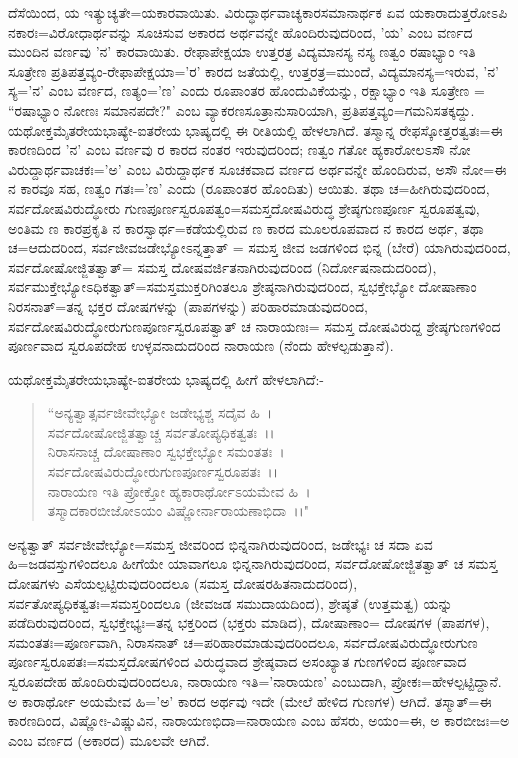 ದೆಸೆಯಿಂದ, ಯ ಇತ್ಯುಚ್ಯತೇ=ಯಕಾರವಾಯಿತು. ವಿರುದ್ಧಾರ್ಥವಾಚ್ಯಕಾರಸಮಾನಾರ್ಥಕ ಏವ ಯಕಾರಾದುತ್ತರೋಽಪಿ ನಕಾರಃ=ವಿರೋಧಾರ್ಥವನ್ನು ಸೂಚಿಸುವ ಅಕಾರದ ಅರ್ಥವನ್ನೇ ಹೊಂದಿರುವುದರಿಂದ, 'ಯ' ಎಂಬ ವರ್ಣದ ಮುಂದಿನ ವರ್ಣವು 'ನ' ಕಾರವಾಯಿತು. ರೇಫಾಪೇಕ್ಷಯಾ ಉತ್ತರತ್ರ ವಿದ್ಯಮಾನಸ್ಯ ನಸ್ಯ ಣತ್ವಂ ರಷಾಭ್ಯಾಂ ಇತಿ ಸೂತ್ರೇಣ ಪ್ರತಿಪತ್ತವ್ಯಂ-ರೇಫಾಪೇಕ್ಷಯಾ='ರ' ಕಾರದ ಜತೆಯಲ್ಲಿ, ಉತ್ತರತ್ರ=ಮುಂದೆ, ವಿದ್ಯಮಾನಸ್ಯ=ಇರುವ, 'ನ' ಸ್ಯ='ನ' ಎಂಬ ವರ್ಣದ, ಣತ್ಯಂ='ಣ' ಎಂದು ರೂಪಾಂತರ ಹೊಂದುವಿಕೆಯನ್ನು, ರಕ್ಷಾಭ್ಯಾಂ ಇತಿ ಸೂತ್ರೇಣ = ``ರಷಾಭ್ಯಾಂ ನೋಣಃ ಸಮಾನಪದೇ?" ಎಂಬ ವ್ಯಾಕರಣಸೂತ್ರಾನುಸಾರಿಯಾಗಿ, ಪ್ರತಿಪತ್ತವ್ಯಂ=ಗಮನಿಸತಕ್ಕದ್ದು. ಯಥೋಕ್ತಮೈತರೇಯಭಾಷ್ಯೇ-ಐತರೇಯ ಭಾಷ್ಯದಲ್ಲಿ ಈ ರೀತಿಯಲ್ಲಿ ಹೇಳಲಾಗಿದೆ. ತಸ್ಮಾನ್ನ ರೇಫಸ್ಕೋತ್ತರತ್ವತಃ=ಈ ಕಾರಣದಿಂದ 'ನ' ಎಂಬ ವರ್ಣವು ರ ಕಾರದ ನಂತರ ಇರುವುದರಿಂದ; ಣತ್ವಂ ಗತೋ ಹ್ಯಕಾರೋಲಽಸೌ ನೋ ವಿರುದ್ದಾರ್ಥವಾಚಕಃ='ಅ' ಎಂಬ ವಿರುದ್ದಾರ್ಥಕ ಸೂಚಕವಾದ ವರ್ಣದ ಅರ್ಥವನ್ನೇ ಹೊಂದಿರುವ, ಅಸೌ ನೋ=ಈ ನ ಕಾರವೂ ಸಹ, ಣತ್ವಂ ಗತಃ='ಣ' ಎಂದು (ರೂಪಾಂತರ ಹೊಂದಿತು) ಆಯಿತು. ತಥಾ ಚ=ಹೀಗಿರುವುದರಿಂದ, ಸರ್ವದೋಷವಿರುದ್ಧೋರು ಗುಣಪೂರ್ಣಸ್ವರೂಪತ್ವಂ=ಸಮಸ್ತದೋಷವಿರುದ್ಧ ಶ್ರೇಷ್ಠಗುಣಪೂರ್ಣ ಸ್ವರೂಪತ್ವವು, ಅಂತಿಮ ಣ ಕಾರಪ್ರಕೃತಿ ನ ಕಾರಸ್ವಾರ್ಥ=ಕಡೆಯಲ್ಲಿರುವ ಣ ಕಾರದ ಮೂಲರೂಪವಾದ ನ ಕಾರದ ಅರ್ಥ, ತಥಾ ಚ=ಆದುದರಿಂದ, ಸರ್ವಜೀವಜಡೇಭ್ಯೋಽನ್ನತ್ತಾತ್ = ಸಮಸ್ತ ಜೀವ ಜಡಗಳಿಂದ ಭಿನ್ನ (ಬೇರೆ) ಯಾಗಿರುವುದರಿಂದ, ಸರ್ವದೋಷೋಜ್ಜಿತತ್ವಾತ್= ಸಮಸ್ತ ದೋಷವರ್ಜಿತನಾಗಿರುವುದರಿಂದ (ನಿರ್ದೋಷನಾದುದರಿಂದ), ಸರ್ವಮುಕ್ತೇಭ್ಯೋಽಧಿಕತ್ವಾತ್=ಸಮಸ್ತಮುಕ್ತರಿಗಿಂತಲೂ ಶ್ರೇಷ್ಠನಾಗಿರುವುದರಿಂದ, ಸ್ವಭಕ್ತೇಭ್ಯೋ ದೋಷಾಣಾಂ ನಿರಸನಾತ್=ತನ್ನ ಭಕ್ತರ ದೋಷಗಳನ್ನು (ಪಾಪಗಳನ್ನು) ಪರಿಹಾರಮಾಡುವುದರಿಂದ, ಸರ್ವದೋಷವಿರುದ್ಧೋರುಗುಣಪೂರ್ಣಸ್ವರೂಪತ್ವಾತ್ ಚ ನಾರಾಯಣಃ= ಸಮಸ್ತ ದೋಷವಿರುದ್ದ ಶ್ರೇಷ್ಠಗುಣಗಳಿಂದ ಪೂರ್ಣವಾದ ಸ್ವರೂಪದೇಹ ಉಳ್ಳವನಾದುದರಿಂದ ನಾರಾಯಣ (ನೆಂದು ಹೇಳಲ್ಪಡುತ್ತಾನೆ).

ಯಥೋಕ್ತಮೈತರೇಯಭಾಷ್ಯೇ-ಐತರೇಯ ಭಾಷ್ಯದಲ್ಲಿ ಹೀಗೆ ಹೇಳಲಾಗಿದೆ:-

\begin{verse}
``ಅನ್ಯತ್ವಾತ್ಸರ್ವಜೀವೇಭ್ಯೋ ಜಡೇಭ್ಯಶ್ಚ ಸದೈವ ಹಿ~।\\ ಸರ್ವದೋಷೋಜ್ಜಿತತ್ವಾಚ್ಚ ಸರ್ವತೋಪ್ಯಧಿಕತ್ವತಃ~।।\\ ನಿರಾಸನಾಚ್ಚ ದೋಷಾಣಾಂ ಸ್ವಭಕ್ತೇಭ್ಯೋ ಸಮಂತತಃ~।\\ ಸರ್ವದೋಷವಿರುದ್ಧೋರುಗುಣಪೂರ್ಣಸ್ವರೂಪತಃ~।।\\ ನಾರಾಯಣ ಇತಿ ಪ್ರೋಕ್ತೋ ಹ್ಯಕಾರಾರ್ಥೋಽಯಮೇವ ಹಿ~।\\ ತಸ್ಮಾದಕಾರಬೀಜೋಽಯಂ ವಿಷ್ಣೋರ್ನಾರಾಯಣಾಭಿದಾ~।।"
\end{verse}

ಅನ್ಯತ್ವಾತ್ ಸರ್ವಜೀವೇಭ್ಯೋ=ಸಮಸ್ತ ಜೀವರಿಂದ ಭಿನ್ನನಾಗಿರುವುದರಿಂದ, ಜಡೇಭ್ಯಃ ಚ ಸದಾ ಏವ ಹಿ=ಜಡವಸ್ತುಗಳಿಂದಲೂ ಹೀಗೆಯೇ ಯಾವಾಗಲೂ ಭಿನ್ನನಾಗಿರುವುದರಿಂದ, ಸರ್ವದೋಷೋಜ್ಜಿತತ್ವಾತ್ ಚ ಸಮಸ್ತ ದೋಷಗಳು ಎಸೆಯಲ್ಪಟ್ಟಿರುವುದರಿಂದಲೂ (ಸಮಸ್ತ ದೋಷರಹಿತನಾದುದರಿಂದ), ಸರ್ವತೋಪ್ಯಧಿಕತ್ವತಃ=ಸಮಸ್ತರಿಂದಲೂ (ಜೀವಜಡ ಸಮುದಾಯದಿಂದ), ಶ್ರೇಷ್ಠತೆ (ಉತ್ತಮತ್ವ) ಯನ್ನು ಪಡೆದಿರುವುದರಿಂದ, ಸ್ವಭಕ್ತೇಭ್ಯಃ=ತನ್ನ ಭಕ್ತರಿಂದ (ಭಕ್ತರು ಮಾಡಿದ), ದೋಷಾಣಾಂ= ದೋಷಗಳ (ಪಾಪಗಳ), ಸಮಂತತಃ=ಪೂರ್ಣವಾಗಿ, ನಿರಾಸನಾತ್ ಚ=ಪರಿಹಾರಮಾಡುವುದರಿಂದಲೂ, ಸರ್ವದೋಷವಿರುದ್ಧೋರುಗುಣ ಪೂರ್ಣಸ್ವರೂಪತಃ=ಸಮಸ್ತದೋಷಗಳಿಂದ ವಿರುದ್ಧವಾದ ಶ್ರೇಷ್ಠವಾದ ಅಸಂಖ್ಯಾತ ಗುಣಗಳಿಂದ ಪೂರ್ಣವಾದ ಸ್ವರೂಪದೇಹ ಹೊಂದಿರುವುದರಿಂದಲೂ, ನಾರಾಯಣ ಇತಿ='ನಾರಾಯಣ' ಎಂಬುದಾಗಿ, ಪ್ರೋಕಃ=ಹೇಳಲ್ಪಟ್ಟಿದ್ದಾನೆ. ಅ ಕಾರಾರ್ಥೋ ಅಯಮೇವ ಹಿ='ಅ' ಕಾರದ ಅರ್ಥವು ಇದೇ (ಮೇಲೆ ಹೇಳಿದ ಗುಣಗಳ) ಆಗಿದೆ. ತಸ್ಮಾತ್=ಈ ಕಾರಣದಿಂದ, ವಿಷ್ಣೋಃ-ವಿಷ್ಣುವಿನ, ನಾರಾಯಣಭಿದಾ=ನಾರಾಯಣ ಎಂಬ ಹೆಸರು, ಅಯಂ=ಈ, ಅ ಕಾರಬೀಜಃ=ಅ ಎಂಬ ವರ್ಣದ (ಅಕಾರದ) ಮೂಲವೇ ಆಗಿದೆ.

